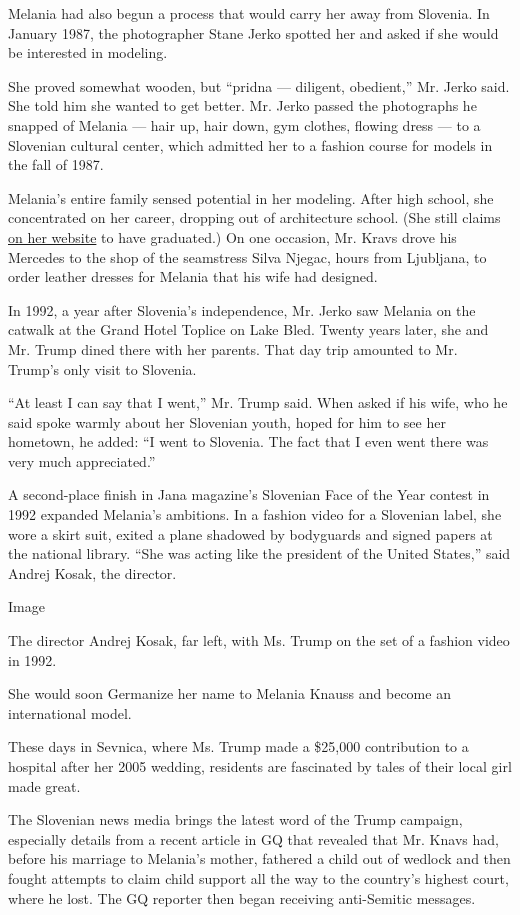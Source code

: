 Melania had also begun a process that would carry her away from
Slovenia. In January 1987, the photographer Stane Jerko spotted her and
asked if she would be interested in modeling.

She proved somewhat wooden, but ``pridna --- diligent, obedient,'' Mr.
Jerko said. She told him she wanted to get better. Mr. Jerko passed the
photographs he snapped of Melania --- hair up, hair down, gym clothes,
flowing dress --- to a Slovenian cultural center, which admitted her to
a fashion course for models in the fall of 1987.

Melania's entire family sensed potential in her modeling. After high
school, she concentrated on her career, dropping out of architecture
school. (She still claims
\href{http://www.melaniatrump.com/my-world/}{on her website} to have
graduated.) On one occasion, Mr. Kravs drove his Mercedes to the shop of
the seamstress Silva Njegac, hours from Ljubljana, to order leather
dresses for Melania that his wife had designed.

In 1992, a year after Slovenia's independence, Mr. Jerko saw Melania on
the catwalk at the Grand Hotel Toplice on Lake Bled. Twenty years later,
she and Mr. Trump dined there with her parents. That day trip amounted
to Mr. Trump's only visit to Slovenia.

``At least I can say that I went,'' Mr. Trump said. When asked if his
wife, who he said spoke warmly about her Slovenian youth, hoped for him
to see her hometown, he added: ``I went to Slovenia. The fact that I
even went there was very much appreciated.''

A second-place finish in Jana magazine's Slovenian Face of the Year
contest in 1992 expanded Melania's ambitions. In a fashion video for a
Slovenian label, she wore a skirt suit, exited a plane shadowed by
bodyguards and signed papers at the national library. ``She was acting
like the president of the United States,'' said Andrej Kosak, the
director.

Image

The director Andrej Kosak, far left, with Ms. Trump on the set of a
fashion video in 1992.

She would soon Germanize her name to Melania Knauss and become an
international model.

These days in Sevnica, where Ms. Trump made a \$25,000 contribution to a
hospital after her 2005 wedding, residents are fascinated by tales of
their local girl made great.

The Slovenian news media brings the latest word of the Trump campaign,
especially details from a recent article in GQ that revealed that Mr.
Knavs had, before his marriage to Melania's mother, fathered a child out
of wedlock and then fought attempts to claim child support all the way
to the country's highest court, where he lost. The GQ reporter then
began receiving anti-Semitic messages.

